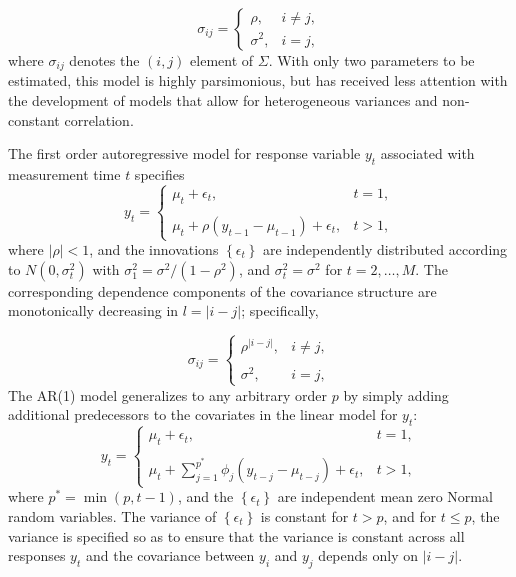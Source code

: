 \begin{equation}\label{eq:compound-symmetric-model}
\sigma_{ij} = \left\{ \begin{array}{lr}
\rho, & i \ne j,\\
\sigma^2, & i = j, 
\end{array}\right.
\end{equation}
\noindent
where $\sigma_{ij}$ denotes the $\left(i,j\right)$ element of $\Sigma$. With only two parameters to be estimated, this model is highly parsimonious, but has received less attention with the development of models that allow for heterogeneous variances and non-constant correlation. 

\bigskip

The first order autoregressive model for response variable $y_t$ associated with measurement time $t$ specifies
\begin{equation}\label{eq:ar-1-model}
y_{t} = \left\{ \begin{array}{lr}
\mu_t + \epsilon_t, & t = 1,\\
& \\
\mu_t + \rho\left(y_{t-1} - \mu_{t-1}\right) + \epsilon_t, & t > 1,
\end{array}\right.
\end{equation}
\bigskip
\noindent 
where $\vert \rho \vert < 1$, and the innovations $\left\{\epsilon_t\right\}$ are independently distributed according to $N\left(0,\sigma_t^2\right)$ with $\sigma_1^2 = \sigma^2/\left(1-\rho^2\right)$, and $\sigma_t^2 = \sigma^2$ for $t = 2, \dots, M$. The corresponding dependence components of the covariance structure are monotonically decreasing in $l = \vert i-j \vert$; specifically,

\begin{equation}\label{eq:compound-symmetric-model}
\sigma_{ij} = \left\{ \begin{array}{lr}
\rho^{\vert i - j \vert}, & i \ne j,\\
& \\
\sigma^2, & i = j, 
\end{array}\right.
\end{equation}
\bigskip
\noindent
The AR(1) model generalizes to any arbitrary order $p$ by simply adding additional predecessors to the covariates in the linear model for $y_t$:
\begin{equation*}
y_{t} = \left\{ \begin{array}{lr}
\mu_t + \epsilon_t, & t = 1,\\
& \\
\mu_t + \sum\limits_{j = 1}^{p^*} \phi_j\left(y_{t-j} - \mu_{t-j}\right) + \epsilon_t, & t > 1,
\end{array}\right.
\end{equation*}
\noindent
where $p^* = \min\left(p,t-1\right)$, and the $\left\{\epsilon_t\right\}$ are independent mean zero Normal random variables. The variance of $\left\{\epsilon_t\right\}$ is constant for $t > p$, and for $t \le p$, the variance is specified so as to ensure that the variance is constant across all responses $y_t$ and the covariance between $y_i$ and $y_j$ depends only on $\vert i - j\vert$. 

